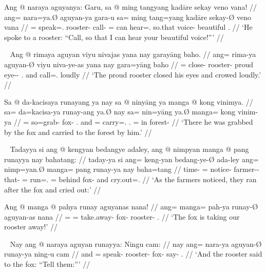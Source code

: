 \a\begingl
	\gla Ang @ naraya aguyanya: Garu, sa @ ming tangyang kadāre sekay veno
		vana! //
	\glb ang= nara=ya.Ø aguyan-ya gara-u sa= ming tang=yang kadāre sekay-Ø veno
		vana //
	\glc \AgtT{}= speak=\TsgM{}.\Top{} rooster-\Loc{} call-\Imp{} \PatT{}= can
		hear=\Fsg{}.\Aarg{} so.that voice-\Top{} beautiful \Second{}.\Gen{} //
	\glft `He spoke to a rooster: \enquote{Call, so that I can hear
		your beautiful voice!}' //
\endgl

\xe

\pex~ %
\a\begingl
	\gla Ang @ rimaya aguyan viyu nivajas yana nay garayāng baho. //
	\glb ang= rima-ya aguyan-Ø viyu niva-ye-as yana nay gara=yāng baho //
	\glc \AgtT{}= close-\TsgM{} rooster-\Top{} proud eye-\Pl{}-\Parg{}
		\TsgM{}.\Gen{} and call=\TsgM{}.\Aarg{} loudly //
	\glft `The proud rooster closed his eyes and crowed loudly.' //
\endgl

\a\begingl
	\gla Sa @ da-kacisaya runayang ya nay sa @ ninyāng ya manga @ kong 
		vinimya. //
	\glb sa= da=kacisa-ya runay-ang ya.Ø nay sa= nin=yāng ya.Ø manga= kong 
		vinim-ya //
	\glc \PatT{}= so=grab-\TsgM{} fox-\Aarg{} \TsgM{}.\Top{} and \PatT{}=
		carry=\TsgM{}.\Aarg{} \TsgM{}.\Top{} \Dir{}= in forest-\Loc{} //
	\glft `There he was grabbed by the fox and carried to the forest by 
		him.' //
\endgl

\xe

\pex~ %
\a\begingl
	\gla Tadayya si ang @ kengyan bedangye adaley, ang @ nimpyan manga @ pang
		runayya nay bahatang: //
	\glb taday-ya si ang= keng-yan bedang-ye-Ø ada-ley ang= nimp=yan.Ø manga=
		pang runay-ya nay baha=tang //
	\glc time-\Loc{} \Rel{} \AgtT{}= notice-\TplM{} farmer-\Pl{}-\Top{}
		that-\PargI{} \AgtT{}= run=\TplM{}.\Top{} \Dir{}= behind fox-\Loc{} and
		cry.out=\TplM{}.\Aarg{} //
	\glft `As the farmers noticed, they ran after the fox and cried out:' //
\endgl

\a\begingl
	\gla Ang @ manga @ pahya runay aguyanas nana! //
	\glb ang= manga= pah-ya runay-Ø aguyan-as nana //
	\glc \AgtT{}= \Prog{}= take.away-\TsgM{} fox-\Top{} rooster-\Parg{}
		\Fsg{}.\Gen{} //
	\glft `The fox is taking our rooster away!' //
\endgl

\xe

\pex~ %
\a\begingl
	\gla Nay ang @ naraya aguyan runayya: Ningu cam: //
	\glb nay ang= nara-ya aguyan-Ø runay-ya ning-u cam //
	\glc and \AgtT{}= speak-\TsgM{} rooster-\Top{} fox-\Loc{} say-\Imp{}
		\TplM{}.\Dat{} //
	\glft `And the rooster said to the fox: \enquote{Tell them:}' //
\endgl

